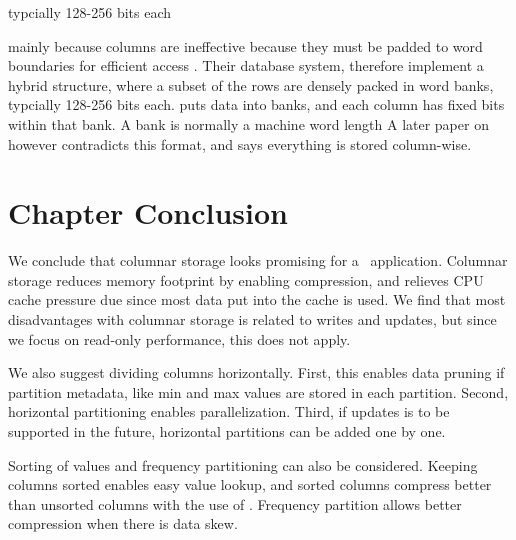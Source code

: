 typcially 128-256 bits each

mainly because columns are ineffective because they must be padded to word boundaries for efficient access \cite{Barber2012-xt}. Their database system,  therefore implement a hybrid structure, where a subset of the rows are densely packed in word banks, typcially 128-256 bits each.  puts data into banks, and each column has fixed bits within that bank. A bank is normally a machine word length \cite{Johnson2008-cp} A later paper on  \cite{Raman2013-em} however contradicts this format, and says everything is stored column-wise.


\section{Chapter Conclusion}
\label{sec:Chapter Conclusion}
We conclude that columnar storage looks promising for a \bd~application. Columnar storage reduces memory footprint by enabling compression, and relieves CPU cache pressure due since most data put into the cache is used. We find that most disadvantages with columnar storage is related to writes and updates, but since we focus on read-only performance, this does not apply. 

We also suggest dividing columns horizontally. First, this enables data pruning if partition metadata, like min and max values are stored in each partition. Second, horizontal partitioning enables parallelization. Third, if updates is to be supported in the future, horizontal partitions can be added one by one.

Sorting of values and frequency partitioning can also be considered. Keeping columns sorted enables easy value lookup, and sorted columns compress better than unsorted columns with the use of \rle. Frequency partition allows better compression when there is data skew.
